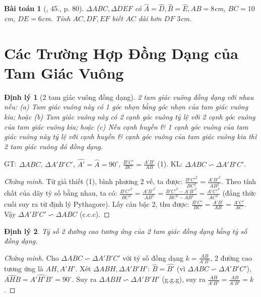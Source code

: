 \documentclass{article}
\newtheorem{baitoan}{Bài toán}
\newtheorem{dinhly}{Định lý}
\begin{document}
\begin{baitoan}[\cite{SGK_Toan_8_tap_2}, 45., p. 80]
	$\Delta ABC,\Delta DEF$ có $\widehat{A} = \widehat{D}, \widehat{B} = \widehat{E}, AB = 8$\emph{cm}, $BC = 10$\emph{cm}, $DE = 6$\emph{cm}. Tính $AC,DF,EF$ biết $AC$ dài hơn $DF$ $3$\emph{cm}.	
\end{baitoan}


\section{Các Trường Hợp Đồng Dạng của Tam Giác Vuông}

\begin{dinhly}[2 tam giác vuông đồng dạng]
	2 tam giác vuông đồng dạng với nhau nếu: (a) Tam giác vuông này có 1 góc nhọn bằng góc nhọn của tam giác vuông kia; hoặc (b) Tam giác vuông này có 2 cạnh góc vuông tỷ lệ với 2 cạnh góc vuông của tam giác vuông kia; hoặc (c) Nếu cạnh huyền \& 1 cạnh góc vuông của tam giác vuông này tỷ lệ với cạnh huyền \& cạnh góc vuông của tam giác vuông kia thì 2 tam giác vuông đó đồng dạng.
\end{dinhly}
GT: $\Delta ABC$, $\Delta A'B'C'$, $\widehat{A'} = \widehat{A} = 90^\circ$, $\frac{B'C'}{BC} = \frac{A'B'}{AB}$ (1). KL: $\Delta ABC\backsim\Delta A'B'C'$.

\begin{proof}[Chứng minh]
	Từ giả thiết (1), bình phương 2 vế, ta được: $\frac{B'C'^2}{BC^2} = \frac{A'B'^2}{AB^2}$. Theo tính chất của dãy tỷ số bằng nhau, ta có: $\frac{B'C'^2}{BC^2} = \frac{A'B'^2}{AB^2} = \frac{B'C'^2 - A'B'^2}{BC^2 - AB^2} = \frac{A'C'^2}{AC^2}$ (đẳng thức cuối suy ra từ định lý Pythagore). Lấy căn bậc 2, thu được: $\frac{B'C'}{BC} = \frac{A'B'}{AB} = \frac{A'C'}{AC}$. Vậy $\Delta A'B'C'\backsim\Delta ABC$ (c.c.c).
\end{proof}

\begin{dinhly}
	\label{thm: heights of congruent triangles}
	Tỷ số 2 đường cao tương ứng của 2 tam giác đồng dạng bằng tỷ số đồng dạng.
\end{dinhly}

\begin{proof}[Chứng minh]
	Cho $\Delta ABC\backsim\Delta A'B'C'$ với tỷ số đồng dạng $k = \frac{AB}{A'B'}$, 2 đường cao tương ứng là $AH,A'H'$. Xét $\Delta ABH,\Delta A'B'H'$: $\widehat{B} = \widehat{B'}$ (vì $\Delta ABC\backsim\Delta A'B'C'$), $\widehat{AHB} = \widehat{A'H'B'} = 90^\circ$. Suy ra $\Delta ABH\backsim\Delta A'B'H'$ (g.g.g), suy ra $\frac{AH}{A'H'} = \frac{AB}{A'B'} = k$.
\end{proof}
\end{document}
